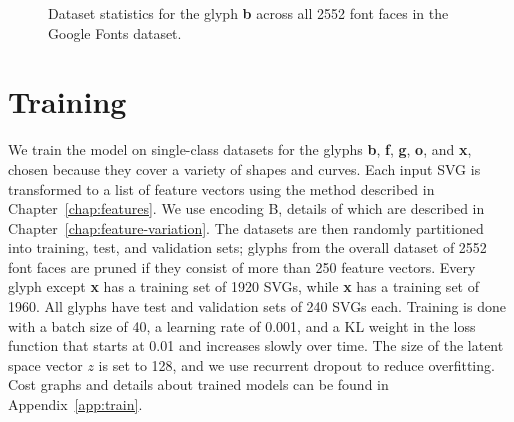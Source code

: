 \begin{figure}[h]
    \caption[Dataset statistics for the glyph \textbf{b}]
    {Dataset statistics for the glyph \textbf{b} across all 2552 font faces in the Google Fonts dataset.\label{fig:stats-b}}
\centering
\subcaptionbox*{}
{
}
\subcaptionbox*{}
{
}
\end{figure}

\section{Training}
We train the model on single-class datasets for the glyphs \textbf{b}, \textbf{f}, \textbf{g}, \textbf{o}, and \textbf{x}, chosen because they cover a variety of shapes and curves.
Each input SVG is transformed to a list of feature vectors using the method described in Chapter~\ref{chap:features}.
We use encoding B, details of which are described in Chapter~\ref{chap:feature-variation}.
The datasets are then randomly partitioned into training, test, and validation sets; glyphs from the overall dataset of 2552 font faces are pruned if they consist of more than 250 feature vectors.
Every glyph except \textbf{x} has a training set of 1920 SVGs, while \textbf{x} has a training set of 1960.
All glyphs have test and validation sets of 240 SVGs each.
Training is done with a batch size of 40, a learning rate of 0.001, and a KL weight in the loss function that starts at 0.01 and increases slowly over time.
The size of the latent space vector $z$ is set to 128, and we use recurrent dropout to reduce overfitting.
Cost graphs and details about trained models can be found in Appendix~\ref{app:train}.

